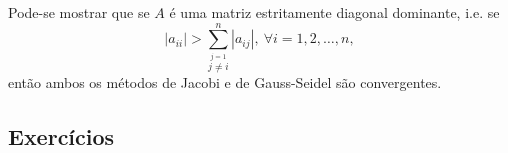 \begin{obs}{}
  Pode-se mostrar que se $A$ é uma matriz estritamente diagonal dominante, i.e. se
  \begin{equation}
    |a_{ii}| > \sum_{\overset{j=1}{j\neq i}}^n |a_{ij}|,~\forall i=1, 2, \ldots, n,
  \end{equation}
então ambos os métodos de Jacobi e de Gauss-Seidel são convergentes.
\end{obs}

\subsection*{Exercícios}

\emconstrucao